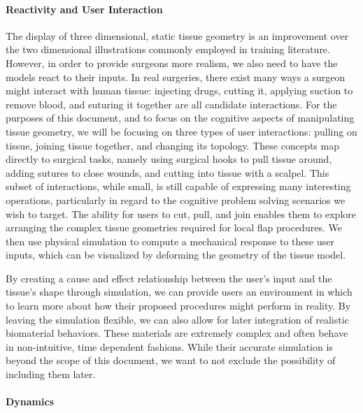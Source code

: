 \paragraph{Reactivity and User Interaction}

The display of three dimensional, static tissue geometry is an
improvement over the two dimensional illustrations commonly employed
in training literature. However, in order to provide surgeons more
realism, we also need to have the models react to their inputs. In
real surgeries, there exist many ways a surgeon might interact with
human tissue: injecting drugs, cutting it, applying suction to remove
blood, and suturing it together are all candidate interactions. For
the purposes of this document, and to focus on the cognitive aspects
of manipulating tissue geometry, we will be focusing on three types of
user interactions: pulling on tissue, joining tissue together, and
changing its topology. These concepts map directly to surgical tasks,
namely using surgical hooks to pull tissue around, adding sutures to
close wounds, and cutting into tissue with a scalpel. This subset of
interactions, while small, is still capable of expressing many
interesting operations, particularly in regard to the cognitive
problem solving scenarios we wish to target. The ability for users to
cut, pull, and join enables them to explore arranging the complex
tissue geometries required for local flap procedures. We then use
physical simulation to compute a mechanical response to these user
inputs, which can be visualized by deforming the geometry of the
tissue model.

By creating a cause and effect relationship between the user's input
and the tissue's shape through simulation, we can provide users an
environment in which to learn more about how their proposed procedures
might perform in reality. By leaving the simulation flexible, we can
also allow for later integration of realistic biomaterial
behaviors. These materials are extremely complex and often behave in
non-intuitive, time dependent fashions. While their accurate simulation
is beyond the scope of this document, we want to not exclude the
possibility of including them later.

\paragraph{Dynamics}

